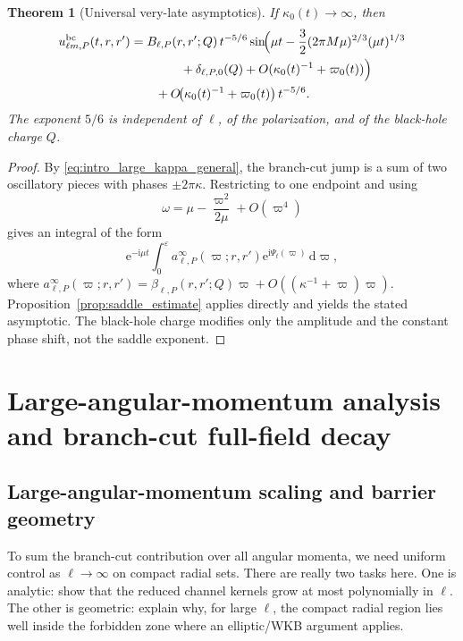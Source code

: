 \documentclass[12pt]{article}
\numberwithin{equation}{section}
\theoremstyle{plain}
\newtheorem{theorem}{Theorem}[section]
\theoremstyle{definition}
\theoremstyle{remark}
\newcommand{\ii}{\mathrm i}
\newcommand{\ee}{\mathrm e}
\newcommand{\dd}{\mathrm d}
\newcommand{\bc}{\mathrm{bc}}
\newcommand{\om}{\omega}
\newcommand{\vp}{\varpi}
\newcommand{\kap}{\kappa}
\newcommand{\eps}{\varepsilon}
\begin{document}
\begin{theorem}[Universal very-late asymptotics]\label{thm:late}
If $\kap_0(t)\to\infty$, then
\begin{align}\label{eq:late_explicit_sine}
   u_{\ell m,P}^{\bc}(t,r,r')
   &=
   B_{\ell,P}(r,r';Q)\,t^{-5/6}
   \sin\!\Bigl(
      \mu t
      -\frac32(2\pi M\mu)^{2/3}(\mu t)^{1/3}
      \notag\\
   &\qquad\qquad
      +\delta_{\ell,P,0}(Q)
      +O(\kap_0(t)^{-1}+\vp_0(t))
   \Bigr)
   \notag\\
   &\qquad
   +O\!\bigl(\kap_0(t)^{-1}+\vp_0(t)\bigr)\,t^{-5/6}.
\end{align}
The exponent $5/6$ is independent of $\ell$, of the polarization, and of the black-hole charge $Q$.
\end{theorem}

\begin{proof}
By \eqref{eq:intro_large_kappa_general}, the branch-cut jump is a sum of two oscillatory pieces with phases $\pm2\pi\kap$.  Restricting to one endpoint and using
\[
   \om=\mu-\frac{\vp^2}{2\mu}+O(\vp^4)
\]
gives an integral of the form
\[
   \ee^{-\ii\mu t}
   \int_0^\eps a_{\ell,P}^\infty(\vp;r,r')
   \ee^{\ii\Psi_t(\vp)}\,\dd\vp,
\]
where $a_{\ell,P}^\infty(\vp;r,r')=\beta_{\ell,P}(r,r';Q)\vp+O((\kap^{-1}+\vp)\vp)$.  Proposition~\ref{prop:saddle_estimate} applies directly and yields the stated asymptotic.  The black-hole charge modifies only the amplitude and the constant phase shift, not the saddle exponent.
\end{proof}


\section{Large-angular-momentum analysis and branch-cut full-field decay}\label{sec:full_field}

\subsection{Large-angular-momentum scaling and barrier geometry}

To sum the branch-cut contribution over all angular momenta, we need uniform control as $\ell\to\infty$ on compact radial sets.  There are really two tasks here.  One is analytic: show that the reduced channel kernels grow at most polynomially in $\ell$.  The other is geometric: explain why, for large $\ell$, the compact radial region lies well inside the forbidden zone where an elliptic/WKB argument applies.
\end{document}
